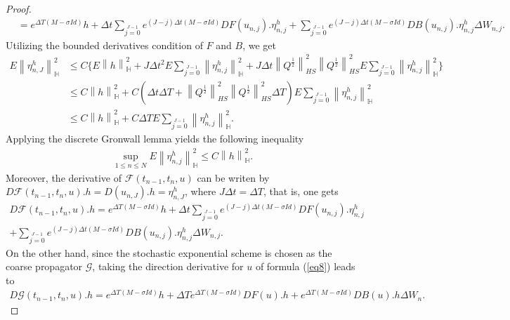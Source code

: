 \documentclass[preprint,12pt]{elsarticle}
\newtheorem{proof}{Proof}
\begin{document}
\begin{proof}
\begin{align*}
		&\!=\!e^{\Delta T(M-\sigma Id)}h\!\!+\!\Delta t\!\sum\limits_{j=0}\limits^{J-1}\!\!e^{(J-j)\Delta t(M-\sigma Id)}\!DF(u _{n,j}).\eta _{n,j}^{h}\!\!+\!\!\sum\limits_{j=0}\limits^{J-1}\!\!e^{(J-j)\Delta t(M-\sigma Id)}\!DB(u _{n,j}).\eta _{n,j}^{h}\Delta W_{n,j}.
	\end{align*}
	Utilizing the bounded derivatives condition of $F$ and $B$, we get
	\begin{align*}
		E\left\|\eta _{n,J}^{h}\right\|_{\mathbb{H}}^2&\leq C\{ E\left\|h\right\|_{\mathbb{H}}^2+J\Delta t^2E\sum\limits_{j=0}\limits^{J-1}\left\|\eta _{n,j}^{h}\right\|_{\mathbb{H}}^2+J \Delta t \left\|Q^{\frac{1}{2}}\right\|_{HS}^2\left\|Q^{\frac{1}{2}}\right\|_{HS}^2E\sum\limits_{j=0}\limits^{J-1}\left\|\eta _{n,j}^{h}\right\|_{\mathbb{H}}^2\}\\
		&\leq C \left\|h\right\|_{\mathbb{H}}^2+C(\Delta t\Delta T+\left\|Q^{\frac{1}{2}}\right\|_{HS}^2\left\|Q^{\frac{1}{2}}\right\|_{HS}^2\Delta T)E\sum\limits_{j=0}\limits^{J-1}\left\|\eta _{n,j}^{h}\right\|_{\mathbb{H}}^2\\
		&\leq C \left\|h\right\|_{\mathbb{H}}^2+C\Delta TE\sum\limits_{j=0}\limits^{J-1}\left\|\eta _{n,j}^{h}\right\|_{\mathbb{H}}^2.
	\end{align*}
	Applying the discrete Gronwall lemma yields the following inequality
	\begin{align}\label{eq31}
		\sup\limits_{1\leq n \leq N}E\left\|\eta _{n,j}^{h}\right\|_{\mathbb{H}}^2\leq C\left\|h\right\|_{\mathbb{H}}^2.
	\end{align}
	Moreover, the derivative of $\mathcal{F}(t_{n-1},t_{n},u)$ can be writen by $D\mathcal{F}(t_{n-1},t_{n},u).h=D(u_{n,J}).h=\eta_{n,J}^{h}$, where $J\Delta t=\Delta T$, that is, one gets
	\begin{align}\label{eq32}
		D\mathcal{F}(t_{n-1},t_{n},u).h=e^{\Delta T(M-\sigma Id)}h+\Delta t\sum\limits_{j=0}\limits^{J-1}e^{(J-j)\Delta t(M-\sigma Id)}DF(u_{n,j}). \eta _{n,j}^{h}\nonumber\\
		+\sum\limits_{j=0}\limits^{J-1}e^{(J-j)\Delta t(M-\sigma Id)}DB(u _{n,j}).\eta _{n,j}^{h}\Delta W_{n,j}.
	\end{align}
	On the other hand, since the stochastic exponential scheme is chosen as the coarse propagator $\mathcal{G}$, taking the direction derivative for $u$ of formula (\ref{eq8}) leads to
	\begin{align}\label{eq33}
		D\mathcal{G}(t_{n-1},t_{n},u).h=e^{\Delta T(M-\sigma Id)}h+\Delta Te^{\Delta T(M-\sigma Id)}DF(u).h+e^{\Delta T(M-\sigma Id)}DB(u).h\Delta W_{n}.
	\end{align}

\end{proof}
\end{document}
